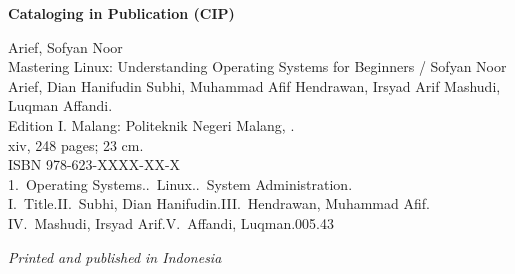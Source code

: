 \begin{titlepage}
\vspace{0.45cm}

\begin{tcolorbox}[
    enhanced,
    colback=white,
    colframe=black!45,
    boxrule=0.5pt,
    arc=1.5pt,
    left=8pt,
    right=8pt,
    top=8pt,
    bottom=8pt
]
{\bfseries\sffamily Cataloging in Publication (CIP)}\par
\vspace{0.25cm}
\begingroup
\setlength{\parindent}{0pt}
Arief, Sofyan Noor\\
\hspace*{1em}Mastering Linux: Understanding Operating Systems for Beginners /
Sofyan Noor Arief, Dian Hanifudin Subhi, Muhammad Afif Hendrawan,
Irsyad Arif Mashudi, Luqman Affandi.\\
\hspace*{1em}Edition I. Malang: Politeknik Negeri Malang, \the\year.\\
\hspace*{1em}xiv, 248 pages; 23 cm.\\[0.2cm]
ISBN 978-623-XXXX-XX-X\\[0.2cm]
1.~Operating Systems..~Linux..~System Administration.\\
I.~Title.\quad II.~Subhi, Dian Hanifudin.\quad III.~Hendrawan, Muhammad Afif.\\
IV.~Mashudi, Irsyad Arif.\quad V.~Affandi, Luqman.\hfill 005.43
\endgroup
\end{tcolorbox}

\vfill

{\small\itshape Printed and published in Indonesia\par}

\end{titlepage}

\cleardoublepage
